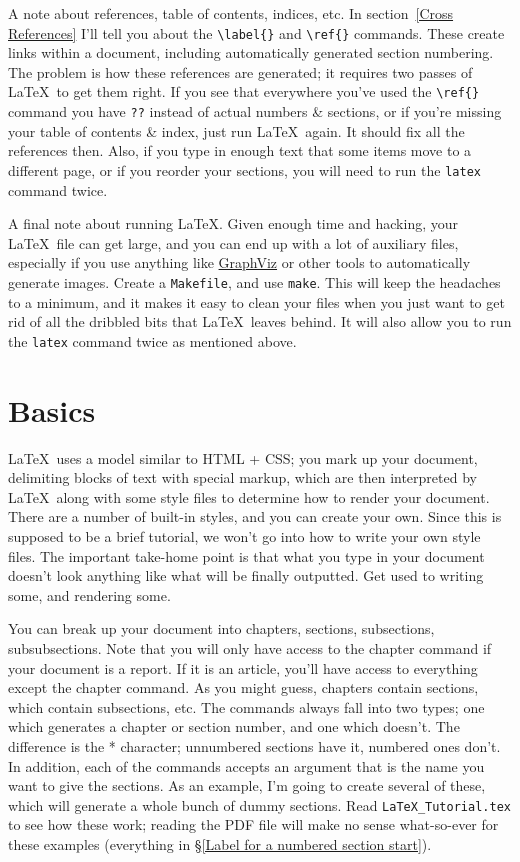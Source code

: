 \documentclass[letterpaper]{article}
\begin{document}
A note about references, table of contents, indices, etc.  In 
section~\ref{Cross References} I'll tell you about the \verb+\label{}+ 
and \verb+\ref{}+ commands.  These create links within a document, 
including automatically generated section numbering.  The problem is how 
these references are generated; it requires two passes of \LaTeX\ to get 
them right.  If you see that everywhere you've used the \verb+\ref{}+ 
command you have \texttt{??} instead of actual numbers \& sections, or 
if you're missing your table of contents \& index, just run \LaTeX\ 
again.  It should fix all the references then.  Also, if you type in 
enough text that some items move to a different page, or if you reorder 
your sections, you will need to run the \verb+latex+ command twice.

A final note about running \LaTeX.  Given enough time and hacking, your 
\LaTeX\ file can get large, and you can end up with a lot of auxiliary 
files, especially if you use anything like 
\href{http://www.graphviz.org/}{GraphViz} or other tools to 
automatically generate images.  Create a \texttt{Makefile}, and use 
\texttt{make}. This will keep the headaches to a minimum, and it makes 
it easy to clean your files when you just want to get rid of all the 
dribbled bits that \LaTeX\ leaves behind.  It will also allow you to run 
the \verb+latex+ command twice as mentioned above.

\section{Basics}

\LaTeX\ uses a model similar to HTML + CSS; you mark up your document, 
delimiting blocks of text with special markup, which are then 
interpreted by \LaTeX\ along with some style files to determine how to 
render your document.  There are a number of built-in styles, and you 
can create your own.  Since this is supposed to be a brief tutorial, we 
won't go into how to write your own style files.  The important 
take-home point is that what you type in your document doesn't look 
anything like what will be finally outputted. Get used to writing some, 
and rendering some.

You can break up your document into chapters, sections, subsections, 
subsubsections.  Note that you will only have access to the chapter 
command if your document is a report.  If it is an article, you'll have 
access to everything except the chapter command.  As you might guess, 
chapters contain sections, which contain subsections, etc.  The commands 
always fall into two types; one which generates a chapter or section 
number, and one which doesn't.  The difference is the * character; 
unnumbered sections have it, numbered ones don't. In addition, each of 
the commands accepts an argument that is the name you want to give the 
sections.  As an example, I'm going to create several of these, which 
will generate a whole bunch of dummy sections. Read 
\texttt{LaTeX\_Tutorial.tex} to see how these work; reading the PDF file
will make no sense what-so-ever for these examples (everything in
\S\ref{Label for a numbered section start}).
\end{document}
